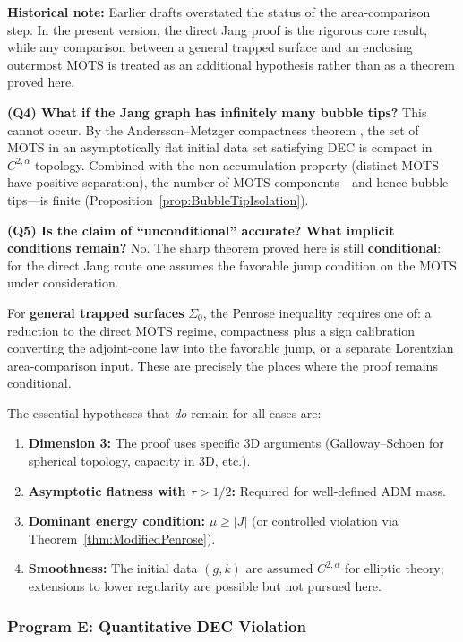\begin{remark}
\textbf{Historical note:} Earlier drafts overstated the status of the area-comparison step. In the present version, the direct Jang proof is the rigorous core result, while any comparison between a general trapped surface and an enclosing outermost MOTS is treated as an additional hypothesis rather than as a theorem proved here.

\textbf{(Q4) What if the Jang graph has infinitely many bubble tips?}
This cannot occur. By the Andersson--Metzger compactness theorem \cite{anderssonmetzger2009}, the set of MOTS in an asymptotically flat initial data set satisfying DEC is compact in $C^{2,\alpha}$ topology. Combined with the non-accumulation property (distinct MOTS have positive separation), the number of MOTS components---and hence bubble tips---is finite (Proposition~\ref{prop:BubbleTipIsolation}).

\textbf{(Q5) Is the claim of ``unconditional'' accurate? What implicit conditions remain?}
No. The sharp theorem proved here is still \textbf{conditional}: for the direct Jang route one assumes the favorable jump condition on the MOTS under consideration.

For \textbf{general trapped surfaces} $\Sigma_0$, the Penrose inequality requires one of: a reduction to the direct MOTS regime, compactness plus a sign calibration converting the adjoint-cone law into the favorable jump, or a separate Lorentzian area-comparison input. These are precisely the places where the proof remains conditional.

The essential hypotheses that \emph{do} remain for all cases are:
\begin{enumerate}
    \item \textbf{Dimension 3:} The proof uses specific 3D arguments (Galloway--Schoen for spherical topology, capacity in 3D, etc.).
    \item \textbf{Asymptotic flatness with $\tau > 1/2$:} Required for well-defined ADM mass.
    \item \textbf{Dominant energy condition:} $\mu \ge |J|$ (or controlled violation via Theorem~\ref{thm:ModifiedPenrose}).
    \item \textbf{Smoothness:} The initial data $(g, k)$ are assumed $C^{2,\alpha}$ for elliptic theory; extensions to lower regularity are possible but not pursued here.
\end{enumerate}
\end{remark}

\subsubsection{Program E: Quantitative DEC Violation}
\label{sec:DECviolation}

